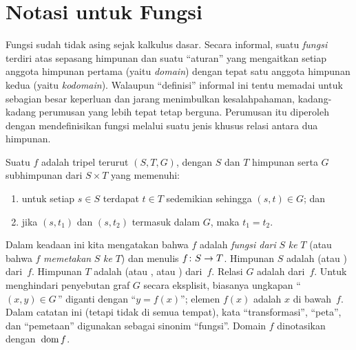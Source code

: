 \vfill\eject










\section*{Notasi untuk Fungsi}
\enlargethispage{2\baselineskip}
Fungsi sudah tidak asing sejak kalkulus dasar. Secara informal, suatu \emph{fungsi} terdiri atas sepasang
himpunan dan suatu ``aturan'' yang mengaitkan setiap anggota himpunan pertama (yaitu
\emph{domain}) dengan tepat satu anggota himpunan kedua (yaitu \emph{kodomain}). Walaupun
``definisi'' informal ini tentu memadai untuk sebagian besar keperluan dan jarang menimbulkan
kesalahpahaman, kadang-kadang perumusan yang lebih tepat tetap berguna. Perumusan itu diperoleh
dengan mendefinisikan fungsi melalui suatu jenis khusus relasi antara dua himpunan.

Suatu
 $f$ adalah tripel terurut $(S,T,G)$, dengan $S$ dan $T$ himpunan serta $G$
subhimpunan dari $S \times T$ yang memenuhi:
 \begin{enumerate}
   \item untuk setiap $s \in S$ terdapat $t \in T$ sedemikian sehingga $(s,t) \in
G$; dan
   \item jika $(s,t_1)$ dan $(s,t_2)$ termasuk dalam $G$, maka $t_1 = t_2$. %
 \end{enumerate}
Dalam keadaan ini kita mengatakan bahwa $f$ adalah \emph{fungsi dari} $S$ \emph{ke} $T$ (atau bahwa
$f$ \emph{memetakan} $S$ \emph{ke} $T$) dan menulis $f\colon S \rightarrow T$. Himpunan $S$ adalah
 (atau
) dari~$f$. Himpunan $T$ adalah
 (atau
, atau
) dari~$f$. Relasi $G$ adalah
 dari~$f$. Untuk menghindari penyebutan graf $G$ secara eksplisit, biasanya
ungkapan ``$(x,y) \in G\,$'' diganti dengan ``$y = f(x)$''; elemen $f(x)$ adalah
 $x$ di bawah~$f$. Dalam catatan ini (tetapi tidak di semua tempat), kata
``transformasi'',
``peta'', dan
``pemetaan'' digunakan sebagai sinonim ``fungsi''. Domain $f$ dinotasikan
dengan~$\operatorname{dom} f$.

